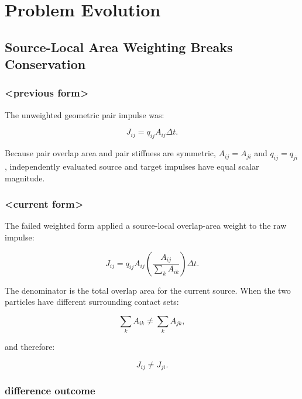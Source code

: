 \section{Problem Evolution}

\subsection{Source-Local Area Weighting Breaks Conservation}

\subsubsection{<previous form>}

The unweighted geometric pair impulse was:

\begin{equation}
J_{ij}=q_{ij}A_{ij}\Delta t.
\end{equation}

Because pair overlap area and pair stiffness are symmetric,
\(A_{ij}=A_{ji}\) and \(q_{ij}=q_{ji}\), independently evaluated source and
target impulses have equal scalar magnitude.

\subsubsection{<current form>}

The failed weighted form applied a source-local overlap-area weight to the raw
impulse:

\begin{equation}
J_{ij}
=
q_{ij}A_{ij}
\left(
\frac{A_{ij}}{\sum_k A_{ik}}
\right)
\Delta t.
\end{equation}

The denominator is the total overlap area for the current source.  When the two
particles have different surrounding contact sets:

\begin{equation}
\sum_k A_{ik}\ne\sum_k A_{jk},
\end{equation}

and therefore:

\begin{equation}
J_{ij}\ne J_{ji}.
\end{equation}

\subsubsection{difference outcome}

